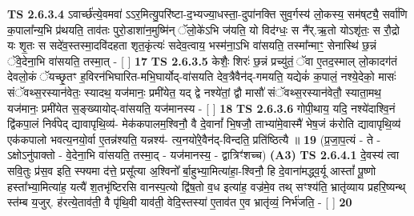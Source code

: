 \documentclass[17pt]{extarticle}
\begin{document}
                  \newline
                                \textbf{ TS 2.6.3.4} \newline
                  ऽवार्च्छ॑त्ये॒वमवा॑ ऽऽर॒मित्यु॒परि॑ष्टा-द॒भ्यज्या॒धस्ता॒-दुपा॑नक्ति सुव॒र्गस्य॑ लो॒कस्य॒ सम॑ष्‌ट्यै॒ सर्वा॑णि क॒पाला᳚न्य॒भि प्र॑थयति॒ ताव॑तः पुरो॒डाशा॑न॒मुष्मि॑न् ॅलो॒के॑ऽभि ज॑यति॒ यो विद॑ग्धः॒ स नै॑र्.ऋ॒तो योऽशृ॑तः॒ स रौ॒द्रो यः शृ॒तः स सदे॑व॒स्तस्मा॒दवि॑दहता शृत॒कृंत्यः॑ सदेव॒त्वाय॒ भस्म॑ना॒ऽभि वा॑सयति॒ तस्मा᳚न्माꣳ॒॒ सेनास्थि॑ छ॒न्नं ॅवे॒देना॒भि वा॑सयति॒ तस्मा॒त् - [  ] \textbf{  17} \newline
                  \newline
                                \textbf{ TS 2.6.3.5} \newline
                  केशैः॒ शिरः॑ छ॒न्नं प्रच्यु॑तं॒ ॅवा ए॒तद॒स्माल् लो॒कादग॑तं देवलो॒कं ॅयच्छृ॒तꣳ ह॒विरन॑भिघारित-मभि॒घार्योद्-वा॑सयति देव॒त्रैवैन॑द्-गमयति॒ यद्येकं॑ क॒पालं॒ नश्ये॒देको॒ मासः॑ संॅवथ्स॒रस्यान॑वेतः॒ स्यादथ॒ यज॑मानः॒ प्रमी॑येत॒ यद् द्वे नश्ये॑तां॒ द्वौ मासौ॑ संॅवथ्स॒रस्यान॑वेतौ॒ स्याता॒मथ॒ यज॑मानः॒ प्रमी॑येत स॒ङ्ख्यायोद्-वा॑सयति॒ यज॑मानस्य - [  ] \textbf{  18} \newline
                  \newline
                                \textbf{ TS 2.6.3.6} \newline
                  गोपी॒थाय॒ यदि॒ नश्ये॑दाश्वि॒नं द्वि॑कपा॒लं निर्व॑पेद् द्यावापृथि॒व्य॑- मेक॑कपालम॒श्विनौ॒ वै दे॒वानां᳚ भि॒षजौ॒ ताभ्या॑मे॒वास्मै॑ भेष॒जं क॑रोति द्यावापृथि॒व्य॑ एक॑कपालो भवत्य॒नयो॒र्वा ए॒तन्न॑श्यति॒ यन्नश्य॑- त्य॒नयो॑रे॒वैन॑द्-विन्दति॒ प्रति॑ष्ठित्यै ॥ \textbf{  19} \newline
                  \newline
                      (प्र॒जा॒प॒त्यं - ते - ऽक्षोऽनु॑पाक्तो - वे॒देना॒भि वा॑सयति॒ तस्मा॒द् - यज॑मानस्य॒ - द्वात्रिꣳ॑शच्च)  \textbf{(A3)} \newline \newline
                                        \textbf{ TS 2.6.4.1} \newline
                  दे॒वस्य॑ त्वा सवि॒तुः प्र॑स॒व इति॒ स्फ्यमा द॑त्ते॒ प्रसू᳚त्या अ॒श्विनो᳚ र्बा॒हुभ्या॒मित्या॑हा॒-श्विनौ॒ हि दे॒वाना॑मद्ध्व॒र्यू आस्तां᳚ पू॒ष्णो हस्ता᳚भ्या॒मित्या॑ह॒ यत्यै॑ श॒तभृ॑ष्टिरसि वानस्प॒त्यो द्वि॑ष॒तो व॒ध इत्या॑ह॒ वज्र॑मे॒व तथ् सꣳश्य॑ति॒ भ्रातृ॑व्याय प्रहरि॒ष्यन्थ् स्त॑म्ब य॒जुर्. ह॑रत्ये॒ताव॑ती॒ वै पृ॑थि॒वी याव॑ती॒ वेदि॒स्तस्या॑ ए॒ताव॑त ए॒व भ्रातृ॑व्यं॒ निर्भ॑जति॒ - [  ] \textbf{  20} \newline
                  \newline
\end{document}
